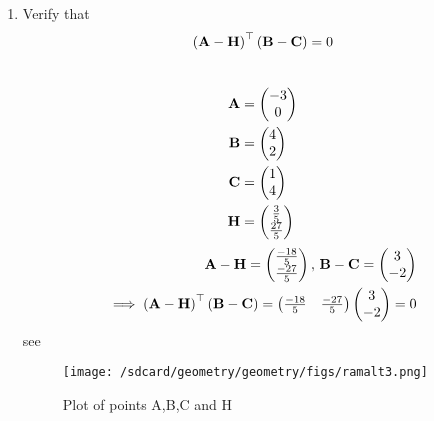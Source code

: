 \documentclass[11pt]{book}
\begin{document}
\begin{enumerate}[label=\thesection.\arabic*.,ref=\thesection.\theenumi]
\item Verify that 
		\begin{align}
			\left(\mathbf{A}-\mathbf{H}\right)^{\top}\left(\mathbf{B}-\mathbf{C}\right) = 0
		\end{align}
\\  \solution
 \begin{align} 
 \mathbf{A} &= \begin{pmatrix} -3\\ 0 \end{pmatrix} \\ 
 \mathbf{B} &= \begin{pmatrix} 4\\ 2 \end{pmatrix}
  \\\mathbf{C} &= \begin{pmatrix} 1\\ 4\end{pmatrix} \\ 
  \mathbf{H} &=\begin{pmatrix}\frac{3}{5}\\ \frac{27}{5}\end{pmatrix}
 \end{align}
\begin{align}
\mathbf{A}-\mathbf{H}=\begin{pmatrix}\frac{-18}{5}\\ \frac{-27}{5}\end{pmatrix},\,
\mathbf{B}-\mathbf{C}=\begin{pmatrix}3\\-2\end{pmatrix}
\\
	\implies \left(\mathbf{A}-\mathbf{H}\right)^{\top}\left(\mathbf{B}-\mathbf{C}\right)=\begin{pmatrix}\frac{-18}{5} & \frac{-27}{5}\end{pmatrix}
\begin{pmatrix}3\\-2\end{pmatrix}
=0
\end{align}
see 
\begin{figure}
    \centering
    \texttt{[image: /sdcard/geometry/geometry/figs/ramalt3.png]}
    \caption{Plot of points A,B,C and H}
    \label{fig:Pts_ABCH}
\end{figure}



\end{enumerate}
\end{document}
